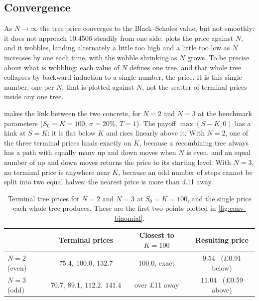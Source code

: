 \documentclass[11pt,a4paper]{article}
\numberwithin{equation}{section}
\theoremstyle{definition}
\theoremstyle{plain}
\theoremstyle{remark}
\begin{document}
\subsection{Convergence}

As $N \to \infty$ the tree price converges to the Black--Scholes value, but not
smoothly: it does not approach $10.4506$ steadily from one side. 
plots the price against $N$, and it wobbles, landing alternately a little too
high and a little too low as $N$ increases by one each time, with the wobble
shrinking as $N$ grows. To be precise about what is wobbling: each value of
$N$ defines one tree, and that whole tree collapses by backward induction to a
single number, the price. It is this single number, one per $N$, that is
plotted against $N$, not the scatter of terminal prices inside any one tree.

 makes the link between the two concrete, for $N=2$
and $N=3$ at the benchmark parameters ($S_0 = K = 100$, $\sigma = 20\%$,
$T = 1$). The payoff $\max(S-K,0)$ has a kink at $S = K$: it is flat below $K$
and rises linearly above it. With $N = 2$, one of the three terminal prices
lands exactly on $K$, because a recombining tree always has a path with
equally many up and down moves when $N$ is even, and an equal number of up and
down moves returns the price to its starting level. With $N = 3$, no terminal
price is anywhere near $K$, because an odd number of steps cannot be split
into two equal halves; the nearest price is more than £11 away.

\begin{table}[H]
  \centering
  \begin{tabular}{lccc}
    \toprule
    & Terminal prices & Closest to $K = 100$ & Resulting price \\
    \midrule
    $N = 2$ (even) & $75.4,\ \mathbf{100.0},\ 132.7$ & $100.0$, exact &
      $9.54$ \ (£0.91 below) \\
    $N = 3$ (odd)  & $70.7,\ 89.1,\ 112.2,\ 141.4$ & over £11 away &
      $11.04$ \ (£0.59 above) \\
    \bottomrule
  \end{tabular}
  \caption{Terminal tree prices for $N = 2$ and $N = 3$ at $S_0 = K = 100$,
    and the single price each whole tree produces. These are the first two
    points plotted in \cref{fig:conv-binomial}.}
  \label{tab:terminal-nodes}
\end{table}
\end{document}
